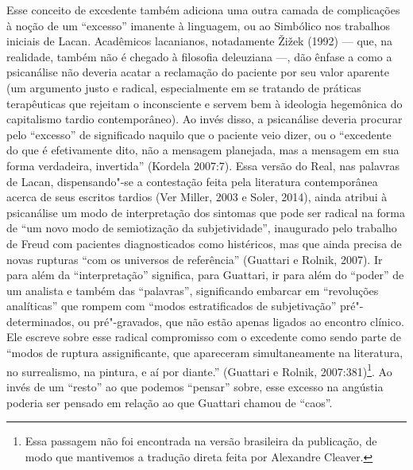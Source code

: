 Esse conceito de excedente também adiciona uma outra camada de
complicações à noção de um ``excesso'' imanente à linguagem, ou ao
Simbólico nos trabalhos iniciais de Lacan. Acadêmicos lacanianos,
notadamente Žižek (1992) --- que, na realidade, também não é chegado à
filosofia deleuziana ---, dão ênfase a como a psicanálise não deveria
acatar a reclamação do paciente por seu valor aparente (um argumento
justo e radical, especialmente em se tratando de práticas terapêuticas
que rejeitam o inconsciente e servem bem à ideologia hegemônica do
capitalismo tardio contemporâneo). Ao invés disso, a psicanálise deveria
procurar pelo ``excesso'' de significado naquilo que o paciente veio
dizer, ou o ``excedente do que é efetivamente dito, não a mensagem
planejada, mas a mensagem em sua forma verdadeira, invertida'' (Kordela
2007:7). Essa versão do Real, nas palavras de Lacan, dispensando"-se a
contestação feita pela literatura contemporânea acerca de seus escritos
tardios (Ver Miller, 2003 e Soler, 2014), ainda atribui à psicanálise um
modo de interpretação dos sintomas que pode ser radical na forma de ``um
novo modo de semiotização da subjetividade'', inaugurado pelo trabalho
de Freud com pacientes diagnosticados como histéricos, mas que ainda
precisa de novas rupturas ``com os universos de referência'' (Guattari e
Rolnik, 2007). Ir para além da ``interpretação'' significa, para
Guattari, ir para além do ``poder'' de um analista e também das
``palavras'', significando embarcar em ``revoluções analíticas'' que
rompem com ``modos estratificados de subjetivação'' pré"-determinados, ou
pré"-gravados, que não estão apenas ligados ao encontro clínico. Ele
escreve sobre esse radical compromisso com o excedente como sendo parte
de ``modos de ruptura assignificante, que apareceram simultaneamente na
literatura, no surrealismo, na pintura, e aí por diante.'' (Guattari e
Rolnik, 2007:381)\footnote{Essa passagem não foi encontrada na versão
  brasileira da publicação, de modo que mantivemos a tradução direta
  feita por Alexandre Cleaver.}. Ao invés de um ``resto'' ao que podemos
``pensar'' sobre, esse excesso na angústia poderia ser pensado em
relação ao que Guattari chamou de ``caos''.

